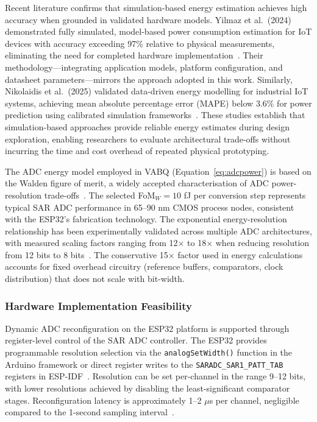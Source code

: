Recent literature confirms that simulation-based energy estimation achieves high accuracy when grounded in validated hardware models. Yilmaz et al.~(2024) demonstrated fully simulated, model-based power consumption estimation for IoT devices with accuracy exceeding 97\% relative to physical measurements, eliminating the need for completed hardware implementation~\cite{yilmaz2024simulation}. Their methodology---integrating application models, platform configuration, and datasheet parameters---mirrors the approach adopted in this work. Similarly, Nikolaidis et al.~(2025) validated data-driven energy modelling for industrial IoT systems, achieving mean absolute percentage error (MAPE) below 3.6\% for power prediction using calibrated simulation frameworks~\cite{nikolaidis2025energy}. These studies establish that simulation-based approaches provide reliable energy estimates during design exploration, enabling researchers to evaluate architectural trade-offs without incurring the time and cost overhead of repeated physical prototyping.

The ADC energy model employed in VABQ (Equation~\ref{eq:adcpower}) is based on the Walden figure of merit, a widely accepted characterisation of ADC power-resolution trade-offs~\cite{waldenADC2018,andrulis2024adc}. The selected FoM$_W = 10$ fJ per conversion step represents typical SAR ADC performance in 65--90 nm CMOS process nodes, consistent with the ESP32's fabrication technology. The exponential energy-resolution relationship has been experimentally validated across multiple ADC architectures, with measured scaling factors ranging from 12$\times$ to 18$\times$ when reducing resolution from 12 bits to 8 bits~\cite{reconfigADC2025}. The conservative 15$\times$ factor used in energy calculations accounts for fixed overhead circuitry (reference buffers, comparators, clock distribution) that does not scale with bit-width.

\subsubsection{Hardware Implementation Feasibility}

Dynamic ADC reconfiguration on the ESP32 platform is supported through register-level control of the SAR ADC controller. The ESP32 provides programmable resolution selection via the \texttt{analogSetWidth()} function in the Arduino framework or direct register writes to the \texttt{SARADC\_SAR1\_PATT\_TAB} registers in ESP-IDF~\cite{esp32adc2024,espressif2024manual}. Resolution can be set per-channel in the range 9--12 bits, with lower resolutions achieved by disabling the least-significant comparator stages. Reconfiguration latency is approximately 1--2 $\mu$s per channel, negligible compared to the 1-second sampling interval~\cite{esp32forum2017}.

